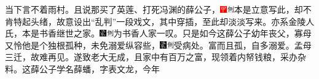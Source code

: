 当下言不着雨村。且说那买了英莲、打死冯渊的薛公子，{\includegraphics[width=3mm]{../Images/00002}\includegraphics[width=3mm]{../Images/00011}\footnotesize \kaishu 本是立意写此，却不肯特起头绪，故意设出“乱判”一段戏文，其中穿插，至此却淡淡写来。}亦系金陵人氏，本是书香继世之家。{\includegraphics[width=3mm]{../Images/00006}\includegraphics[width=3mm]{../Images/00011}\footnotesize \kaishu 为书香人家一叹。}只是如今这薛公子幼年丧父，寡母又怜他是个独根孤种，未免溺爱纵容些，{\includegraphics[width=3mm]{../Images/00006}\includegraphics[width=3mm]{../Images/00011}\footnotesize \kaishu 受病处。富而且孤，自多溺爱。孟母三迁，故难再见。}遂致老大无成，且家中有百万之富，现领着内帑钱粮，采办杂料。这薛公子学名薛蟠，字表文龙，今年